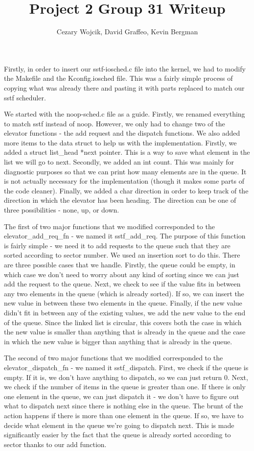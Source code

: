 \documentclass[letterpaper,10pt,titlepage,fleqn]{article}
\title{Project 2 Group 31 Writeup}
\author{Cezary Wojcik, David Graffeo, Kevin Bergman}
\begin{document}
\maketitle

Firstly, in order to insert our sstf-iosched.c file into the kernel, we had to modify the Makefile and the Kconfig.iosched file. This was a fairly simple process of copying what was already there and pasting it with parts replaced to match our sstf scheduler.

We started with the noop-sched.c file as a guide. Firstly, we renamed everything to match sstf instead of noop. However, we only had to change two of the elevator functions - the add request and the dispatch functions. We also added more items to the data struct to help us with the implementation. Firstly, we added a struct list\_head *next pointer. This is a way to save what element in the list we will go to next. Secondly, we added an int count. This was mainly for diagnostic purposes so that we can print how many elements are in the queue. It is not actually necessary for the implementation (though it makes some parts of the code cleaner). Finally, we added a char direction in order to keep track of the direction in which the elevator has been heading. The direction can be one of three possibilities - none, up, or down.

The first of two major functions that we modified corresponded to the elevator\_add\_req\_fn - we named it sstf\_add\_req. The purpose of this function is fairly simple - we need it to add requests to the queue such that they are sorted according to sector number. We used an insertion sort to do this. There are three possible cases that we handle. Firstly, the queue could be empty, in which case we don't need to worry about any kind of sorting since we can just add the request to the queue. Next, we check to see if the value fits in between any two elements in the queue (which is already sorted). If so, we can insert the new value in between these two elements in the queue. Finally, if the new value didn't fit in between any of the existing values, we add the new value to the end of the queue. Since the linked list is circular, this covers both the case in which the new value is smaller than anything that is already in the queue and the case in which the new value is bigger than anything that is already in the queue.

The second of two major functions that we modified corresponded to the elevator\_dispatch\_fn - we named it sstf\_dispatch. First, we check if the queue is empty. If it is, we don't have anything to dispatch, so we can just return 0. Next, we check if the number of items in the queue is greater than one. If there is only one element in the queue, we can just dispatch it - we don't have to figure out what to dispatch next since there is nothing else in the queue. The brunt of the action happens if there is more than one element in the queue. If so, we have to decide what element in the queue we're going to dispatch next. This is made significantly easier by the fact that the queue is already sorted according to sector thanks to our add function.
\end{document}
